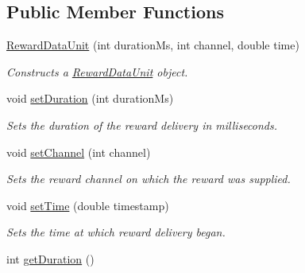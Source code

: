 \subsection*{Public Member Functions}
\begin{DoxyCompactItemize}
\item 
\hyperlink{class_picto_1_1_reward_data_unit_a023d4f4cd9a13420f24d8735a8b1408b}{Reward\-Data\-Unit} (int duration\-Ms, int channel, double time)
\begin{DoxyCompactList}\small\item\em Constructs a \hyperlink{class_picto_1_1_reward_data_unit}{Reward\-Data\-Unit} object. \end{DoxyCompactList}\item 
\hypertarget{class_picto_1_1_reward_data_unit_a52b96d0b52854e8a503e8ebb97be3fc0}{void \hyperlink{class_picto_1_1_reward_data_unit_a52b96d0b52854e8a503e8ebb97be3fc0}{set\-Duration} (int duration\-Ms)}\label{class_picto_1_1_reward_data_unit_a52b96d0b52854e8a503e8ebb97be3fc0}

\begin{DoxyCompactList}\small\item\em Sets the duration of the reward delivery in milliseconds. \end{DoxyCompactList}\item 
\hypertarget{class_picto_1_1_reward_data_unit_a9de238afe0855a4166d2466c838b8e58}{void \hyperlink{class_picto_1_1_reward_data_unit_a9de238afe0855a4166d2466c838b8e58}{set\-Channel} (int channel)}\label{class_picto_1_1_reward_data_unit_a9de238afe0855a4166d2466c838b8e58}

\begin{DoxyCompactList}\small\item\em Sets the reward channel on which the reward was supplied. \end{DoxyCompactList}\item 
\hypertarget{class_picto_1_1_reward_data_unit_a116b9d001099367e4df85008febd0d3d}{void \hyperlink{class_picto_1_1_reward_data_unit_a116b9d001099367e4df85008febd0d3d}{set\-Time} (double timestamp)}\label{class_picto_1_1_reward_data_unit_a116b9d001099367e4df85008febd0d3d}

\begin{DoxyCompactList}\small\item\em Sets the time at which reward delivery began. \end{DoxyCompactList}\item 
\hypertarget{class_picto_1_1_reward_data_unit_a31389b189d3b32645fd38dc2f2a0f1d2}{int \hyperlink{class_picto_1_1_reward_data_unit_a31389b189d3b32645fd38dc2f2a0f1d2}{get\-Duration} ()}\label{class_picto_1_1_reward_data_unit_a31389b189d3b32645fd38dc2f2a0f1d2}


\end{DoxyCompactItemize}
